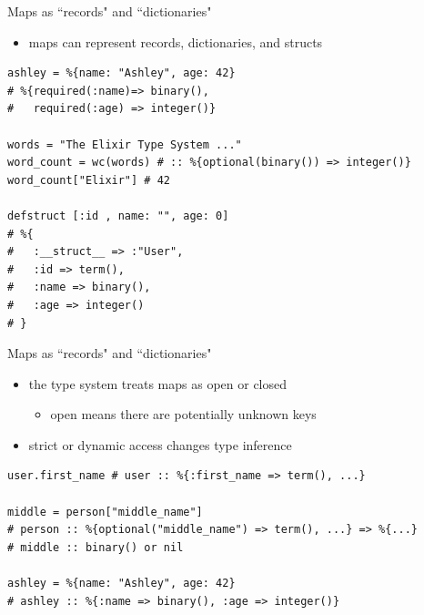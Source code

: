 \documentclass[
  ignorenonframetext,
  aspectratio=169]{beamer}
\providecommand{\tightlist}{%
  \setlength{\itemsep}{0pt}\setlength{\parskip}{0pt}}
\begin{document}
\begin{frame}[fragile]{Maps as ``records" and ``dictionaries"}
\label{maps-as-records-and-dictionaries}
\begin{itemize}
\tightlist
\item
  maps can represent records, dictionaries, and structs
\end{itemize}

\begin{lstlisting}
ashley = %{name: "Ashley", age: 42}
# %{required(:name)=> binary(),
#   required(:age) => integer()}

words = "The Elixir Type System ..."
word_count = wc(words) # :: %{optional(binary()) => integer()}
word_count["Elixir"] # 42

defstruct [:id , name: "", age: 0]
# %{
#   :__struct__ => :"User",
#   :id => term(),
#   :name => binary(),
#   :age => integer()
# }
\end{lstlisting}
\end{frame}

\begin{frame}[fragile]{Maps as ``records" and ``dictionaries"}
\label{maps-as-records-and-dictionaries-1}
\begin{itemize}
\tightlist
\item
  the type system treats maps as open or closed

  \begin{itemize}
  \tightlist
  \item
    open means there are potentially unknown keys
  \end{itemize}
\item
  strict or dynamic access changes type inference
\end{itemize}

\begin{lstlisting}
user.first_name # user :: %{:first_name => term(), ...}

middle = person["middle_name"]
# person :: %{optional("middle_name") => term(), ...} => %{...}
# middle :: binary() or nil

ashley = %{name: "Ashley", age: 42}
# ashley :: %{:name => binary(), :age => integer()}
\end{lstlisting}
\end{frame}
\end{document}
